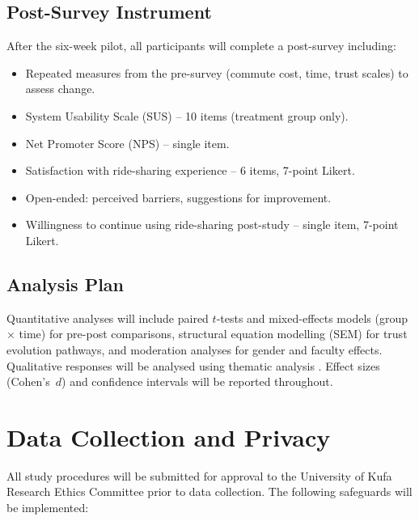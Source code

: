 \documentclass[12pt,a4paper]{article}
\begin{document}
\subsection{Post-Survey Instrument}

After the six-week pilot, all participants will complete a post-survey including:

\begin{itemize}[nosep]
  \item Repeated measures from the pre-survey (commute cost, time, trust scales) to assess change.
  \item System Usability Scale (SUS) -- 10 items (treatment group only).
  \item Net Promoter Score (NPS) -- single item.
  \item Satisfaction with ride-sharing experience -- 6 items, 7-point Likert.
  \item Open-ended: perceived barriers, suggestions for improvement.
  \item Willingness to continue using ride-sharing post-study -- single item, 7-point Likert.
\end{itemize}

\subsection{Analysis Plan}

Quantitative analyses will include paired $t$-tests and mixed-effects models (group $\times$ time) for pre-post comparisons, structural equation modelling (SEM) for trust evolution pathways, and moderation analyses for gender and faculty effects. Qualitative responses will be analysed using thematic analysis \citep{Braun2006}. Effect sizes (Cohen's~$d$) and confidence intervals will be reported throughout.

\section{Data Collection and Privacy}
\label{sec:ethics}

All study procedures will be submitted for approval to the University of Kufa Research Ethics Committee prior to data collection. The following safeguards will be implemented:
\end{document}
